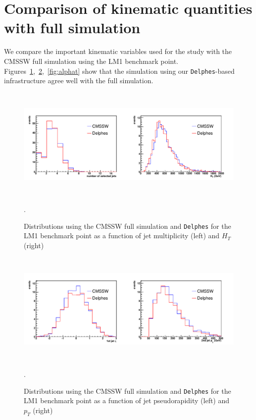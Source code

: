\section{Comparison of kinematic quantities with full simulation}
\label{sec:cmsdelphescomp}
We compare the important kinematic variables used for the study with the CMSSW full
simulation using the LM1 benchmark point. Figures~\ref{fig:njetht},~\ref{fig:jetpteta},~\ref{fig:alphat}
show that the simulation using our {\tt Delphes}-based infrastructure agree well with the full simulation.

\begin{figure}[htbp]
\begin{center}
\includegraphics[height=5.5cm]{figs/njetht.pdf} 
\caption{Distributions using the CMSSW full simulation and {\tt Delphes} for the LM1 benchmark point as a function of jet multiplicity (left) and $H_T$ (right)}.
\label{fig:njetht}
\end{center}
\end{figure}


\begin{figure}[htbp]
\begin{center}
\includegraphics[height=5.5cm]{figs/jet1pteta.pdf} 
\caption{Distributions using the CMSSW full simulation and {\tt Delphes} for the LM1 benchmark point 
as a function of jet pseudorapidity (left) and $p_T$ (right)}.
\label{fig:jetpteta}
\end{center}
\end{figure}

